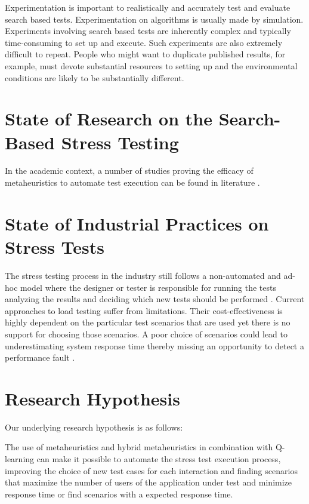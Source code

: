Experimentation is important to realistically and accurately test and evaluate search based tests. Experimentation on algorithms is usually made by simulation. Experiments involving search based tests are inherently complex and typically time-consuming to set up and execute. Such experiments are also extremely difficult to repeat. People who might want to duplicate published results, for example, must devote substantial resources to setting up and the environmental conditions are likely to be substantially different.




\section{State of Research on the Search-Based Stress  Testing}

In the academic context, a number of studies proving the efficacy of metaheuristics to automate test execution can be found in literature \cite{Afzal2009a}. 

\section{State of Industrial Practices on Stress Tests}

The stress testing process in the industry still follows a non-automated and ad-hoc model where the designer or tester is responsible for running the tests analyzing the results and deciding which new tests should be performed \cite{Lewis2005}. Current approaches to load testing suffer from limitations. Their cost-effectiveness is highly dependent on the particular test scenarios that are used yet there is no support for choosing those scenarios. A poor choice of scenarios could lead to underestimating system response time thereby missing an opportunity to detect a performance fault \cite{Zhang2011}.


\section{Research Hypothesis}





Our underlying research hypothesis is as follows:

\begin{mybox}
The use of metaheuristics and hybrid metaheuristics in combination with Q-learning can make it possible to automate the stress test execution process, improving the choice of new test cases for each interaction and finding scenarios that maximize the number of users of the application under test and minimize response time or find scenarios with a expected response time.
\end{mybox}

